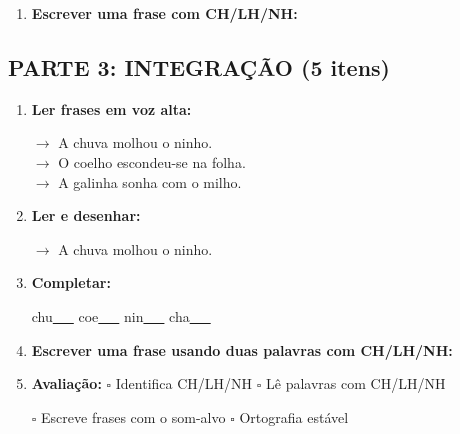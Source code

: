 \begin{exercicio}
\begin{enumerate}[resume]
  \item \textbf{Escrever uma frase com CH/LH/NH:}
  \begin{center}
  \underline{\hspace{12cm}}
  \end{center}

\end{enumerate}

\subsection*{PARTE 3: INTEGRAÇÃO (5 itens)}

\begin{enumerate}[resume]

  \item \textbf{Ler frases em voz alta:}
  \begin{center}
  $\rightarrow$ A chuva molhou o ninho.\\
  $\rightarrow$ O coelho escondeu-se na folha.\\
  $\rightarrow$ A galinha sonha com o milho.\\
  \end{center}

  \item \textbf{Ler e desenhar:}
  \begin{center}
  $\rightarrow$ A chuva molhou o ninho.
  \end{center}
  \begin{center}
  \end{center}

  \item \textbf{Completar:}
  \begin{center}
  chu\underline{~~~} \quad coe\underline{~~~} \quad nin\underline{~~~} \quad cha\underline{~~~}
  \end{center}

  \item \textbf{Escrever uma frase usando duas palavras com CH/LH/NH:}
  \begin{center}
  \underline{\hspace{12cm}}
  \end{center}

  \item \textbf{Avaliação:} $\square$ Identifica CH/LH/NH \quad $\square$ Lê palavras com CH/LH/NH
  \begin{center}
  $\square$ Escreve frases com o som-alvo \quad $\square$ Ortografia estável
  \end{center}


\end{enumerate}
\end{exercicio}
